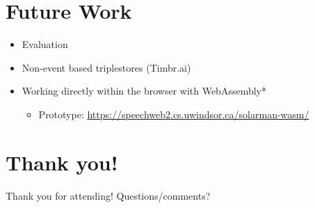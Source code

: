 \documentclass[logoontitle,tabu,supertabular,aspectratio=43]{preney-uwindsor-beamer}
\begin{document}
	\section{Future Work}
	\begin{frame}{\insertsection}
		\begin{itemize}
            \item Evaluation %
			\item Non-event based triplestores (Timbr.ai)
            \item Working directly within the browser with WebAssembly*
            \begin{itemize}
                \item Prototype: \url{https://speechweb2.cs.uwindsor.ca/solarman-wasm/}
            \end{itemize}
		\end{itemize}
	\end{frame}


	\section*{Thank you!}
	\begin{frame}
		\begin{center}
			\huge Thank you for attending!  Questions/comments?
		\end{center}
	\end{frame}

%
%
%
\end{document}
